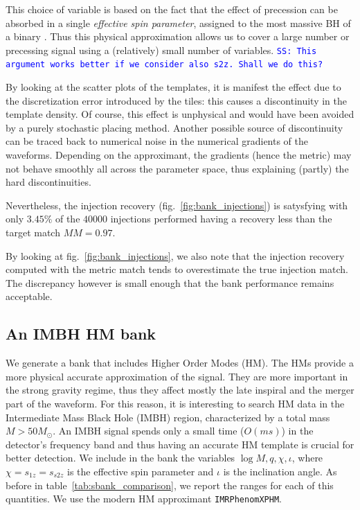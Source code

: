 \documentclass[twocolumn,showpacs,preprintnumbers,nofootinbib,prd,
superscriptaddress,10pt]{revtex4-2}
\newcommand{\stefano}[1]{{\textcolor{blue}{\texttt{SS: #1}} }}
\begin{document}
This choice of variable is based on the fact that the effect of precession can be absorbed in a single {\it effective spin parameter}, assigned to the most massive BH of a binary \cite{}. Thus this physical approximation allows us to cover a large number or precessing signal using a (relatively) small number of variables. \stefano{This argument works better if we consider also s2z. Shall we do this?}

By looking at the scatter plots of the templates, it is manifest the effect due to the discretization error introduced by the tiles: this causes a discontinuity in the template density. Of course, this effect is unphysical and would have been avoided by a purely stochastic placing method.
Another possible source of discontinuity can be traced back to numerical noise in the numerical gradients of the waveforms. Depending on the approximant, the gradients (hence the metric) may not behave smoothly all across the parameter space, thus explaining (partly) the hard discontinuities.

Nevertheless, the injection recovery (fig.~\ref{fig:bank_injections}) is satysfying with only $3.45\%$ of the $40000$ injections performed having a recovery less than the target match $MM = 0.97$.

By looking at fig.~\ref{fig:bank_injections}, we also note that the injection recovery computed with the metric match tends to overestimate the true injection match. The discrepancy however is small enough that the bank performance remains acceptable.

\subsection{An IMBH HM bank}\label{sec:HM_bank}

We generate a bank that includes Higher Order Modes \cite{something_about_HM} (HM). The HMs provide a more physical accurate approximation of the signal. They are more important in the strong gravity regime, thus they affect mostly the late inspiral and the merger part of the waveform.
For this reason, it is interesting to search HM data in the Intermediate Mass Black Hole (IMBH) region, characterized by a total mass $M>50 M_\odot$. An IMBH signal spends only a small time ($O(ms)$) in the detector's frequency band and thus having an accurate HM template is crucial for better detection.
We include in the bank the variables $\log M, q, \chi, \iota$, where $\chi=s_{1z}=s_{s2z}$ is the effective spin parameter and $\iota$ is the inclination angle.
As before in table~\ref{tab:sbank_comparison}, we report the ranges for each of this quantities. We use the modern HM approximant \texttt{IMRPhenomXPHM}.
\end{document}
